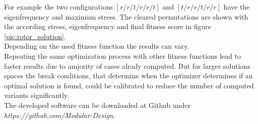 For example the two configurations $[r/r/t/r/r/t]$ and $[t/r/r/t/r/r]$ have the eigenfrequency and maximum stress.
The cleared permutations are shown with the according stress, eigenfrequency and final fitness score in figure \ref{pic:rotor_solution}.\\
Depending on the used fitness function the results can vary.\\ 
Repeating the same optimization process with other fitness functions lead to faster results due to amjority of cases alrady computed.
But for larger solutions spaces the break conditions, 
that determine when the optimizer determines if an optimal solution is found,
could be calibrated to reduce the number of computed variants significantly.\\
The developed software can be downloaded at Github under \emph{https://github.com/Modular-Design}.
